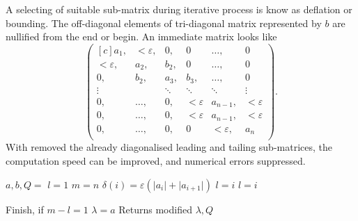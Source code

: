 \begin{refsection}
A selecting of suitable sub-matrix during iterative process is know as deflation
or bounding. The off-diagonal elements of tri-diagonal matrix represented by
$b$ are nullified from the end or begin. An immediate matrix looks like
\begin{equation}
  \begin{pmatrix*}[c]
    a_1, & <\varepsilon,   & 0,   & 0        & \ldots, & 0\\
    <\varepsilon, & a_2,   & b_2, & 0        & \ldots, & 0\\
    0,   & b_2,   & a_3, & b_3,     & \ldots, & 0\\
    \vdots & {}     & \ddots & \ddots & \ddots  & \vdots\\

    0,   & \dots, & 0,   & <\varepsilon  & a_{n-1}, & <\varepsilon\\

    0,   & \dots, & 0,   & <\varepsilon  & a_{n-1}, & <\varepsilon\\
    0,   & \dots, & 0,   & 0       & <\varepsilon, & a_n\\
  \end{pmatrix*}.
\end{equation}
With removed the already diagonalised leading and tailing sub-matrices,
the computation speed can be improved, and numerical errors suppressed.



\begin{algorithm}
  \caption{Determines eigenvalues and eigenvectors.}
  \label{alg:qreig}
  \begin{algorithmic}
    \State {}
    \State $a,b,Q =$ 
    \State $l = 1$
    \State $m = n$
    \State $\delta(i) = \varepsilon(\lvert a_i \rvert + \lvert a_{i+1} \rvert)$
    \EndFor
    \State $l = i$
    \EndIf
    \State $l = i$
    \EndIf
    \EndFor

    \State {}
    \EndIf

    \State Finish, if $m - l = 1$
    \EndFor
    \State $\lambda = a$
    \State Returns modified $\lambda,Q$
    \EndFunction
  \end{algorithmic}
\end{algorithm}




\end{refsection}
